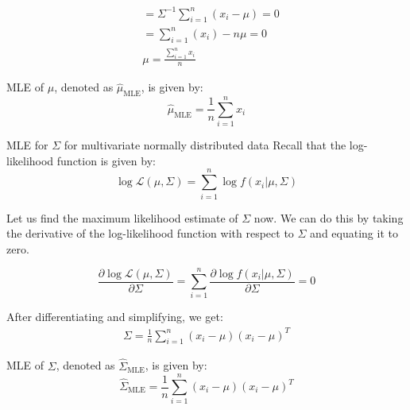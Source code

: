 \documentclass[handout]{beamer}
\begin{document}
\begin{frame}
    
    \begin{align*}
      &=\Sigma^{-1}\sum_{i=1}^n(x_i-\mu) = 0 \\
      &=\sum_{i=1}^n(x_i) - n\mu = 0 \\
      &\mu = \frac{\sum_{i=1}^n x_i}{n}      
    \end{align*} 

    \begin{tcolorbox}[colback=metropolisblue!5,colframe=metropolisblue,title=Maximum Likelihood Estimate for $\mu$]
        MLE of $\mu$, denoted as $\hat{\mu}_{\text{MLE}}$, is given by:
        \begin{equation*}
            \hat{\mu}_{\text{MLE}} = \frac{1}{n}\sum_{i=1}^n x_i
        \end{equation*}
    \end{tcolorbox}
    
\end{frame}

\begin{frame}{MLE for $\Sigma$ for multivariate normally distributed data}
    Recall that the log-likelihood function is given by:
    \begin{equation}
        \log \mathcal{L}(\mu, \Sigma) = \sum_{i=1}^n \log f(x_i|\mu, \Sigma)
    \end{equation}

    Let us find the maximum likelihood estimate of $\Sigma$ now. We can do this by taking the derivative of the log-likelihood function with respect to $\Sigma$ and equating it to zero.   

    \begin{equation}
        \frac{\partial \log \mathcal{L}(\mu, \Sigma)}{\partial \Sigma} = \sum_{i=1}^n \frac{\partial \log f(x_i|\mu, \Sigma)}{\partial \Sigma} = 0
    \end{equation}
    
\end{frame}
\begin{frame}
    After differentiating and simplifying, we get:
    \begin{align*}
      \Sigma = \frac{1}{n}\sum_{i=1}^n(x_i-\mu)(x_i-\mu)^T  
    \end{align*} 

    \begin{tcolorbox}[colback=metropolisblue!5,colframe=metropolisblue,title=Maximum Likelihood Estimate for $\Sigma$]
        MLE of $\Sigma$, denoted as $\hat{\Sigma}_{\text{MLE}}$, is given by:
        \begin{equation*}
            \hat{\Sigma}_{\text{MLE}} = \frac{1}{n}\sum_{i=1}^n (x_i-\mu)(x_i-\mu)^T
        \end{equation*}
    \end{tcolorbox}
\end{frame}
\end{document}
